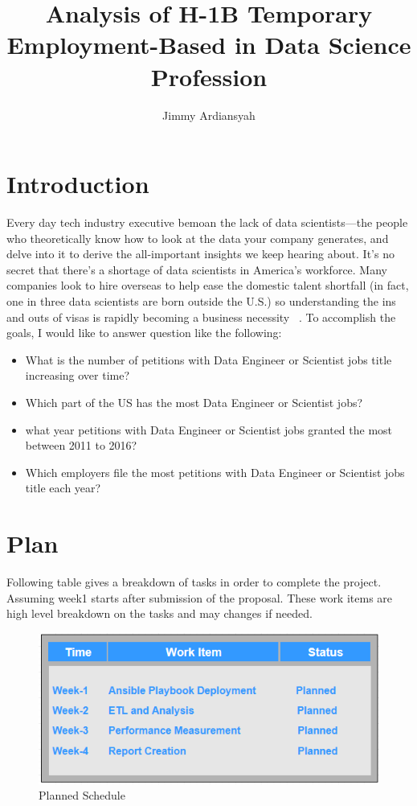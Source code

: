 \documentclass[9pt,twocolumn,twoside]{../../styles/osajnl}
\title{Analysis of H-1B Temporary Employment-Based in Data Science Profession}
\author[1,*]{Jimmy Ardiansyah}
\affil[1]{School of Informatics and Computing, Bloomington, IN 47408, U.S.A.}
\affil[*]{jardians@indiana.edu - S17-IR-2002}
\begin{document}
\maketitle

\section{Introduction}
Every day tech industry executive bemoan the lack of data scientists—the people who theoretically know how to look at the data your company generates, and delve into it to derive the all-important insights we keep hearing about. It’s no secret that there’s a shortage of data scientists in America’s workforce. Many companies look to hire overseas to help ease the domestic talent shortfall (in fact, one in three data scientists are born outside the U.S.) so understanding the ins and outs of visas is rapidly becoming a business necessity  ~\cite{www-hbr}. To accomplish the goals, I would like to answer question
like the following:

\begin{itemize}
  \item What is the number of petitions with Data Engineer or Scientist jobs title increasing over time?
  \item Which part of the US has the most Data Engineer or Scientist  jobs?
  \item what year petitions with Data Engineer or Scientist jobs granted the most between 2011 to 2016?
  \item  Which employers file the most petitions with Data Engineer or Scientist jobs title each year?
\end{itemize}


\section{Plan}
Following table gives a breakdown of tasks in order to complete the project. Assuming week1 starts after submission of the proposal. These work items are high level breakdown on the tasks and may changes if needed.

\begin{figure}[H]
 \centering
\includegraphics[scale=0.6]{images/image11}
\caption{Planned Schedule}
\end{figure}
\end{document}
